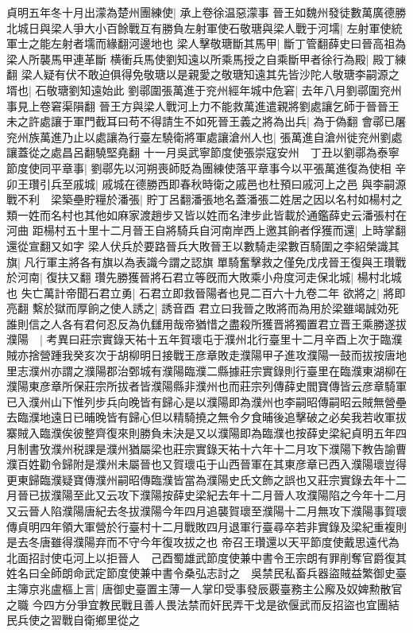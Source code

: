 貞明五年冬十月出濛為楚州團練使|{
	承上卷徐温惡濛事}
晉王如魏州發徒數萬廣德勝北城日與梁人爭大小百餘戰互有勝負左射軍使石敬瑭與梁人戰于河壖|{
	左射軍使統軍士之能左射者壖而緣翻河邊地也}
梁人擊敬瑭斷其馬甲|{
	斷丁管翻薛史曰晉高祖為梁人所襲馬甲連革斷}
横衝兵馬使劉知遠以所乘馬授之自乘斷甲者徐行為殿|{
	殿丁練翻}
梁人疑有伏不敢迫俱得免敬瑭以是親愛之敬瑭知遠其先皆沙陀人敬瑭李嗣源之壻也|{
	石敬瑭劉知遠始此}
劉鄩圍張萬進于兖州經年城中危窘|{
	去年八月劉鄩圍兖州事見上卷窘渠隕翻}
晉王方與梁人戰河上力不能救萬進遣親將劉處讓乞師于晉晉王未之許處讓于軍門截耳曰苟不得請生不如死晉王義之將為出兵|{
	為于偽翻}
會鄩已屠兖州族萬進乃止以處讓為行臺左驍衛將軍處讓滄州人也|{
	張萬進自滄州徙兖州劉處讓蓋從之處昌呂翻驍堅堯翻}
十一月吳武寧節度使張崇寇安州　丁丑以劉鄩為泰寧節度使同平章事|{
	劉鄩先以河朔喪師貶為團練使落平章事今以平張萬進復為使相}
辛卯王瓚引兵至戚城|{
	戚城在德勝西即春秋時衛之戚邑也杜預曰戚河上之邑}
與李嗣源戰不利　梁築壘貯糧於潘張|{
	貯丁呂翻潘張地名蓋潘張二姓居之因以名村如楊村之類一姓而名村也其他如麻家渡趙步又皆以姓而名津步此皆載於通鑑薛史云潘張村在河曲}
距楊村五十里十二月晉王自將騎兵自河南岸西上邀其餉者俘獲而還|{
	上時掌翻還從宣翻又如字}
梁人伏兵於要路晉兵大敗晉王以數騎走梁數百騎圍之李紹榮識其旗|{
	凡行軍主將各有旗以為表識今謂之認旗}
單騎奮擊救之僅免戊戌晉王復與王瓚戰於河南|{
	復扶又翻}
瓚先勝獲晉將石君立等旣而大敗乘小舟度河走保北城|{
	楊村北城也}
失亡萬計帝聞石君立勇|{
	石君立即救晉陽者也見二百六十九卷二年}
欲將之|{
	將即亮翻}
繫於獄而厚餉之使人誘之|{
	誘音酉}
君立曰我晉之敗將而為用於梁雖竭誠効死誰則信之人各有君何忍反為仇讎用哉帝猶惜之盡殺所獲晋將獨置君立晋王乘勝遂拔濮陽　|{
	考異曰莊宗實錄天祐十五年賀瓌屯于濮州北行臺里十二月辛酉上次于臨濮賊亦捨營踵我癸亥次于胡柳明日接戰王彦章敗走濮陽甲子進攻濮陽一鼓而拔按唐地里志濮州亦謂之濮陽郡治鄄城有濮陽臨濮二縣據莊宗實錄則行臺里在臨濮東湖柳在濮陽東彦章所保莊宗所拔者皆濮陽縣非濮州也而莊宗列傳薛史閻寶傳皆云彦章騎軍已入濮州山下惟列步兵向晚皆有歸心是以濮陽即為濮州也李嗣昭傳嗣昭云賊無營壘去臨濮地遠日已晡晚皆有歸心但以精騎撓之無令夕食晡後追擊破之必矣我若收軍拔寨賊入臨濮俟彼整齊復來則勝負未決是又以濮陽即為臨濮也按薛史梁紀貞明五年四月制書攷濮州税課是濮州猶屬梁也莊宗實錄天祐十六年十二月攻下濮陽下教告諭曹濮百姓勸令歸附是濮州未屬晉也又賀瓌屯于山西晉軍在其東彦章已西入濮陽瓌豈得更東歸臨濮疑寶傳濮州嗣昭傳臨濮皆當為濮陽史氏文飾之誤也又莊宗實錄去年十二月晉已拔濮陽至此又云攻下濮陽按薛史梁紀去年十二月晉人攻濮陽陷之今年十二月又云晉人陷濮陽唐紀去冬拔濮陽今年四月追襲賀瓌至濮陽十二月無攻下濮陽事賀瓌傳貞明四年領大軍營於行臺村十二月戰敗四月退軍行臺尋卒若非實錄及梁紀重複則是去冬唐雖得濮陽弃而不守今年復攻拔之也}
帝召王瓚還以天平節度使戴思遠代為北面招討使屯河上以拒晉人　己酉蜀雄武節度使兼中書令王宗朗有罪削奪官爵復其姓名曰全師朗命武定節度使兼中書令桑弘志討之　吳禁民私畜兵器盜賊益繁御史臺主簿京兆盧樞上言|{
	唐御史臺置主薄一人掌印受事發辰覈臺務主公廨及奴婢勲散官之職}
今四方分爭宜教民戰且善人畏法禁而奸民弄干戈是欲偃武而反招盜也宜團結民兵使之習戰自衛鄉里從之

